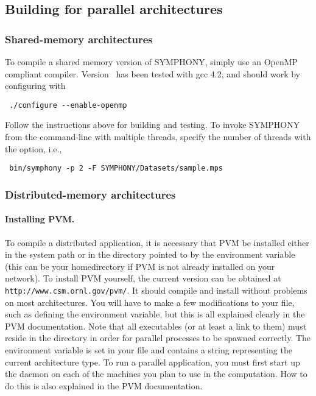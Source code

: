 \subsection{Building for parallel architectures}

\subsubsection{Shared-memory architectures}

To compile a shared memory version of SYMPHONY, simply use an OpenMP compliant
compiler. Version \VER\  has been tested with gcc 4.2, and should work by
configuring with
{\color{Brown}
\begin{verbatim}
 ./configure --enable-openmp
\end{verbatim}
}
Follow the instructions above for building and testing. To invoke SYMPHONY
from the command-line with multiple threads, specify the number of threads
with the  option, i.e.,
{\color{Brown}
\begin{verbatim}
 bin/symphony -p 2 -F SYMPHONY/Datasets/sample.mps
\end{verbatim}
}

\subsubsection{Distributed-memory architectures}
\label{distributed-build}

\paragraph{Installing PVM.}
\label{PVM}
To compile a distributed application, it is necessary that PVM be installed
either in the system path or in the directory pointed to by the environment
variable  (this can be your homedirectory if PVM is not
already installed on your network). To install PVM yourself, the current
version can be obtained at \texttt{
{http://www.csm.ornl.gov/pvm/}}. It should compile and install without
problems on most architectures. You will have to make a few modifications to
your  file, such as defining the  environment
variable, but this is all explained clearly in the PVM documentation. Note
that all executables (or at least a link to them) must reside in the  directory in order for parallel processes to be
spawned correctly. The environment variable  is set in your
 file and contains a string representing the current architecture
type. To run a parallel application, you must first start up the daemon on
each of the machines you plan to use in the computation. How to do this is
also explained in the PVM documentation.

